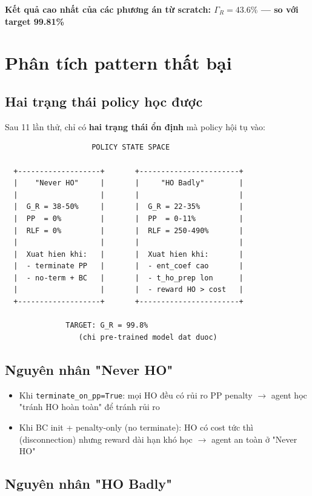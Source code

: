 \documentclass[11pt]{article}
\begin{document}
\textbf{Kết quả cao nhất của các phương án từ scratch: $\Gamma_R = 43.6\%$ --- so với target 99.81\%}

\section{Phân tích pattern thất bại}

\subsection{Hai trạng thái policy học được}

Sau 11 lần thử, chỉ có \textbf{hai trạng thái ổn định} mà policy hội tụ vào:

\begin{lstlisting}
                    POLICY STATE SPACE

  +-------------------+       +-----------------------+
  |    "Never HO"     |       |     "HO Badly"        |
  |                   |       |                       |
  |  G_R = 38-50%     |       |  G_R = 22-35%         |
  |  PP  = 0%         |       |  PP  = 0-11%          |
  |  RLF = 0%         |       |  RLF = 250-490%       |
  |                   |       |                       |
  |  Xuat hien khi:   |       |  Xuat hien khi:       |
  |  - terminate PP   |       |  - ent_coef cao       |
  |  - no-term + BC   |       |  - t_ho_prep lon      |
  |                   |       |  - reward HO > cost   |
  +-------------------+       +-----------------------+

              TARGET: G_R = 99.8%
                 (chi pre-trained model dat duoc)
\end{lstlisting}

\subsection{Nguyên nhân "Never HO"}

\begin{itemize}
  \item Khi \texttt{terminate\_on\_pp=True}: mọi HO đều có rủi ro PP penalty $\rightarrow$ agent học "tránh HO hoàn toàn" để tránh rủi ro
  \item Khi BC init + penalty-only (no terminate): HO có cost tức thì (disconnection) nhưng reward dài hạn khó học $\rightarrow$ agent an toàn ở "Never HO"
\end{itemize}

\subsection{Nguyên nhân "HO Badly"}
\end{document}

